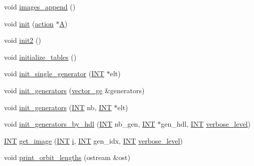 \begin{DoxyCompactItemize}
void \mbox{\hyperlink{classschreier_a0bf31525b834e2e488ce77b72fcce502}{images\+\_\+append}} ()
\item 
void \mbox{\hyperlink{classschreier_a7443bebde2aa08acae16c0ff29c9abcf}{init}} (\mbox{\hyperlink{classaction}{action}} $\ast$\mbox{\hyperlink{classschreier_a1a33e8aaeb25635fbb26da7730bff499}{A}})
\item 
void \mbox{\hyperlink{classschreier_aef6a65e2f39bd9e14c61139c4f97f4c3}{init2}} ()
\item 
void \mbox{\hyperlink{classschreier_acccc16670f88b14ddc69856cd5c0b36d}{initialize\+\_\+tables}} ()
\item 
void \mbox{\hyperlink{classschreier_a6f04f2e67ec0f25135b064579a0fad32}{init\+\_\+single\+\_\+generator}} (\mbox{\hyperlink{galois_8h_a09fddde158a3a20bd2dcadb609de11dc}{I\+NT}} $\ast$elt)
\item 
void \mbox{\hyperlink{classschreier_a04fd581636085a7414e1b5d1004e44e0}{init\+\_\+generators}} (\mbox{\hyperlink{classvector__ge}{vector\+\_\+ge}} \&generators)
\item 
void \mbox{\hyperlink{classschreier_a30ddd571fd95302f1b7d757d5a0b5745}{init\+\_\+generators}} (\mbox{\hyperlink{galois_8h_a09fddde158a3a20bd2dcadb609de11dc}{I\+NT}} nb, \mbox{\hyperlink{galois_8h_a09fddde158a3a20bd2dcadb609de11dc}{I\+NT}} $\ast$elt)
\item 
void \mbox{\hyperlink{classschreier_a9adf1976cee6d540a36d3a0a1bd887ba}{init\+\_\+generators\+\_\+by\+\_\+hdl}} (\mbox{\hyperlink{galois_8h_a09fddde158a3a20bd2dcadb609de11dc}{I\+NT}} nb\+\_\+gen, \mbox{\hyperlink{galois_8h_a09fddde158a3a20bd2dcadb609de11dc}{I\+NT}} $\ast$gen\+\_\+hdl, \mbox{\hyperlink{galois_8h_a09fddde158a3a20bd2dcadb609de11dc}{I\+NT}} \mbox{\hyperlink{simeon_8_c_a818073fbcc2f439e7c56952f67386122}{verbose\+\_\+level}})
\item 
\mbox{\hyperlink{galois_8h_a09fddde158a3a20bd2dcadb609de11dc}{I\+NT}} \mbox{\hyperlink{classschreier_a1fd2d08cb31c9e4357e124554ca2773f}{get\+\_\+image}} (\mbox{\hyperlink{galois_8h_a09fddde158a3a20bd2dcadb609de11dc}{I\+NT}} \mbox{\hyperlink{alphabet2_8_c_acb559820d9ca11295b4500f179ef6392}{i}}, \mbox{\hyperlink{galois_8h_a09fddde158a3a20bd2dcadb609de11dc}{I\+NT}} gen\+\_\+idx, \mbox{\hyperlink{galois_8h_a09fddde158a3a20bd2dcadb609de11dc}{I\+NT}} \mbox{\hyperlink{simeon_8_c_a818073fbcc2f439e7c56952f67386122}{verbose\+\_\+level}})
\item 
void \mbox{\hyperlink{classschreier_a8c7409ed71c0d8f234555eec3bc028a3}{print\+\_\+orbit\+\_\+lengths}} (ostream \&ost)
\item 

\end{DoxyCompactItemize}
